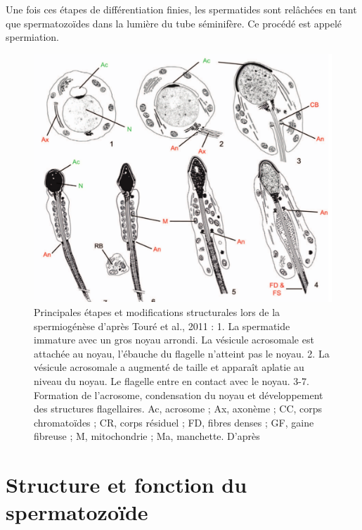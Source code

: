 \documentclass[12pt,twoside]{reedthesis}
\theoremstyle{definition}
\theoremstyle{definition}
\theoremstyle{remark}
\begin{document}
  Une fois ces étapes de différentiation finies, les spermatides sont
  relâchées en tant que spermatozoïdes dans la lumière du tube séminifère.
  Ce procédé est appelé spermiation.
  
  \begin{figure}
  
  {\centering \includegraphics[scale=0.3]{figure/spermiogenese} 
  
  }
  
  \caption[Principales étapes et modifications structurales lors de la spermiogénèse]{Principales étapes et modifications structurales lors de la spermiogénèse d'après Touré et al., 2011 : 1. La spermatide immature avec un gros noyau arrondi. La vésicule acrosomale est attachée au noyau, l’ébauche du flagelle n’atteint pas le noyau. 2. La vésicule acrosomale a augmenté de taille et apparaît aplatie au niveau du noyau. Le flagelle entre en contact avec le noyau. 3-7. Formation de l’acrosome, condensation du noyau et développement des structures flagellaires. Ac, acrosome ; Ax, axonème ; CC, corps chromatoïdes ; CR, corps résiduel ; FD, fibres denses ; GF, gaine fibreuse ; M, mitochondrie ; Ma, manchette. D’après }\label{fig:spermiogenese}
  \end{figure}
  
  \newpage  
  
  \section{Structure et fonction du
  spermatozoïde}\label{structure-et-fonction-du-spermatozoide}
  
\end{document}
